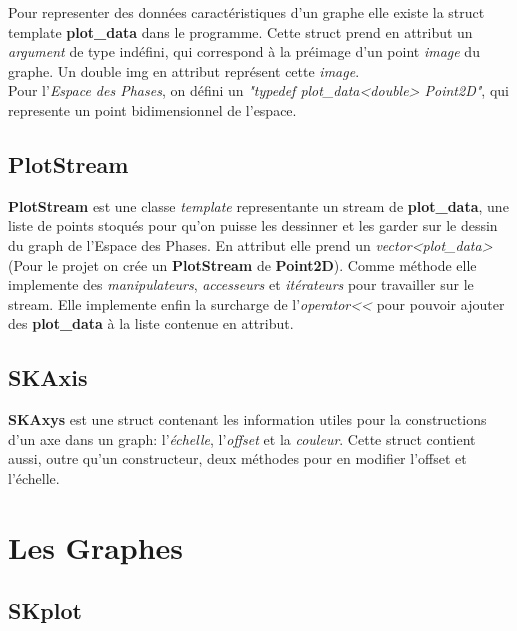 \documentclass{report}
\begin{document}
Pour representer des données caractéristiques d'un graphe elle existe la struct template \textbf{plot\_data} dans le programme.
Cette struct prend en attribut un \textit{argument} de type indéfini, qui correspond à la préimage d'un point \textit{image} du graphe.
Un double img en attribut représent cette \textit{image}.
\\
Pour l'\textit{Espace des Phases}, on défini un \textit{"typedef plot\_data<double> Point2D"}, qui represente un point bidimensionnel de l'espace.

\subsection{PlotStream}

\textbf{PlotStream} est une classe \textit{template} representante un stream de \textbf{plot\_data}, une liste de points stoqués pour qu'on puisse les dessinner et les garder sur le dessin du graph de l'Espace des Phases.
En attribut elle prend un \textit{vector<plot\_data>} (Pour le projet on crée un \textbf{PlotStream} de \textbf{Point2D}).
Comme méthode elle implemente des \textit{manipulateurs}, \textit{accesseurs} et \textit{itérateurs} pour travailler sur le stream.
Elle implemente enfin la surcharge de l'\textit{operator<<} pour pouvoir ajouter des \textbf{plot\_data} à la liste contenue en attribut.

\subsection{SKAxis}

\textbf{SKAxys} est une struct contenant les information utiles pour la constructions d'un axe dans un graph: l'\textit{échelle}, l'\textit{offset} et la \textit{couleur}.
Cette struct contient aussi, outre qu'un constructeur, deux méthodes pour en modifier l'offset et l'échelle.

\section{Les Graphes}

\subsection{SKplot}
\end{document}
